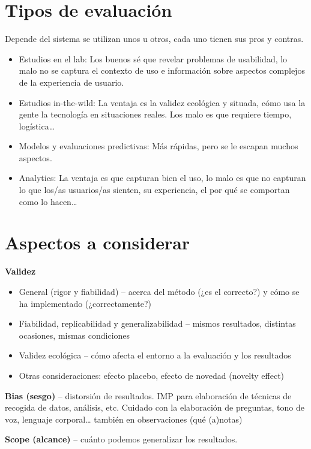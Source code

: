 \documentclass[12pt]{report} %
\begin{document}
\section{Tipos de evaluación}
Depende del sistema se utilizan unos u otros, cada uno tienen sus pros y contras.
\begin{itemize}
  \item Estudios en el lab: Los buenos sé que revelar problemas de usabilidad, lo malo no se captura el contexto de uso e información sobre aspectos complejos de la experiencia de usuario.
  \item Estudios in-the-wild: La ventaja es la validez ecológica y situada, cómo usa la gente la tecnología en situaciones reales. Los malo es que requiere tiempo, logística…
  \item Modelos y evaluaciones predictivas: Más rápidas, pero se le escapan muchos aspectos.
  \item Analytics: La ventaja es que capturan bien el uso, lo malo es que no capturan lo que los/as usuarios/as sienten, su experiencia, el por qué se comportan como lo hacen…
\end{itemize}
  
\section{Aspectos a considerar}
\textbf{Validez}
\begin{itemize}
  \item General (rigor y fiabilidad) – acerca del método (¿es el correcto?) y cómo se ha implementado (¿correctamente?)
  \item Fiabilidad, replicabilidad y generalizabilidad – mismos resultados, distintas ocasiones, mismas condiciones
  \item Validez ecológica – cómo afecta el entorno a la evaluación y los resultados
  \item Otras consideraciones: efecto placebo, efecto de novedad (novelty effect)
\end{itemize}

\textbf{Bias (sesgo)} – distorsión de resultados. IMP para elaboración de técnicas de recogida de datos, análisis, etc. Cuidado con la elaboración de preguntas, tono de voz, lenguaje corporal… también en observaciones (qué (a)notas)

\textbf{Scope (alcance)} – cuánto podemos generalizar los resultados.
\end{document}
